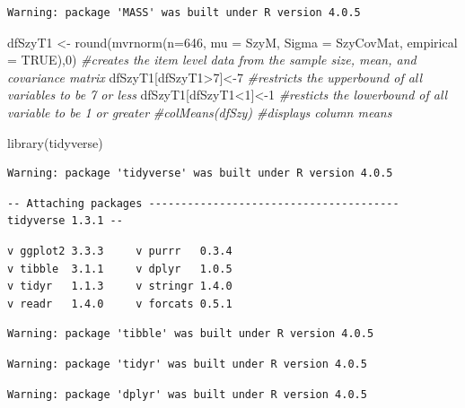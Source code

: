 \documentclass[
  english,
]{book}
\newenvironment{Shaded}{\begin{snugshade}}{\end{snugshade}}
\newcommand{\AttributeTok}[1]{\textcolor[rgb]{0.77,0.63,0.00}{#1}}
\newcommand{\CommentTok}[1]{\textcolor[rgb]{0.56,0.35,0.01}{\textit{#1}}}
\newcommand{\ConstantTok}[1]{\textcolor[rgb]{0.00,0.00,0.00}{#1}}
\newcommand{\DecValTok}[1]{\textcolor[rgb]{0.00,0.00,0.81}{#1}}
\newcommand{\FunctionTok}[1]{\textcolor[rgb]{0.00,0.00,0.00}{#1}}
\newcommand{\NormalTok}[1]{#1}
\newcommand{\OtherTok}[1]{\textcolor[rgb]{0.56,0.35,0.01}{#1}}
\newcommand{\SpecialCharTok}[1]{\textcolor[rgb]{0.00,0.00,0.00}{#1}}
\begin{document}
\begin{verbatim}
Warning: package 'MASS' was built under R version 4.0.5
\end{verbatim}

\begin{Shaded}
\begin{Highlighting}[]
\NormalTok{dfSzyT1 }\OtherTok{\textless{}{-}} \FunctionTok{round}\NormalTok{(}\FunctionTok{mvrnorm}\NormalTok{(}\AttributeTok{n=}\DecValTok{646}\NormalTok{, }\AttributeTok{mu =}\NormalTok{ SzyM, }\AttributeTok{Sigma =}\NormalTok{ SzyCovMat, }\AttributeTok{empirical =} \ConstantTok{TRUE}\NormalTok{),}\DecValTok{0}\NormalTok{) }\CommentTok{\#creates the item level data from the sample size, mean, and covariance matrix}
\NormalTok{dfSzyT1[dfSzyT1}\SpecialCharTok{\textgreater{}}\DecValTok{7}\NormalTok{]}\OtherTok{\textless{}{-}}\DecValTok{7} \CommentTok{\#restricts the upperbound of all variables to be 7 or less}
\NormalTok{dfSzyT1[dfSzyT1}\SpecialCharTok{\textless{}}\DecValTok{1}\NormalTok{]}\OtherTok{\textless{}{-}}\DecValTok{1} \CommentTok{\#resticts the lowerbound of all variable to be 1 or greater}
\CommentTok{\#colMeans(dfSzy) \#displays column means}

\FunctionTok{library}\NormalTok{(tidyverse)}
\end{Highlighting}
\end{Shaded}

\begin{verbatim}
Warning: package 'tidyverse' was built under R version 4.0.5
\end{verbatim}

\begin{verbatim}
-- Attaching packages --------------------------------------- tidyverse 1.3.1 --
\end{verbatim}

\begin{verbatim}
v ggplot2 3.3.3     v purrr   0.3.4
v tibble  3.1.1     v dplyr   1.0.5
v tidyr   1.1.3     v stringr 1.4.0
v readr   1.4.0     v forcats 0.5.1
\end{verbatim}

\begin{verbatim}
Warning: package 'tibble' was built under R version 4.0.5
\end{verbatim}

\begin{verbatim}
Warning: package 'tidyr' was built under R version 4.0.5
\end{verbatim}

\begin{verbatim}
Warning: package 'dplyr' was built under R version 4.0.5
\end{verbatim}
\end{document}
